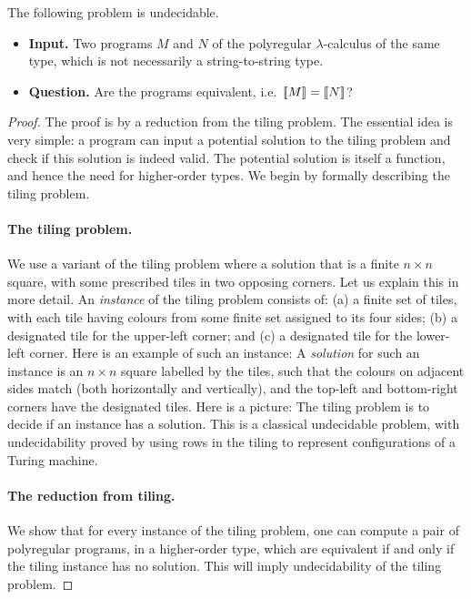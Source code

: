 \documentclass{article}
\begin{document}
\begin{theorem}\label{thm:undecidability}
    The following problem is undecidable. 
    \begin{itemize}
        \item \textbf{Input.} Two programs $M$ and $N$ of the polyregular $\lambda$-calculus of the same type, which is not necessarily a string-to-string type.
        \item \textbf{Question.} Are the programs equivalent, i.e.~$[\![M]\!] = [\![N]\!]$?
    \end{itemize}
\end{theorem}
\begin{proof}
The proof is by a reduction from the tiling problem. The essential idea is very simple: a program can input a potential solution to the tiling problem and check if this solution is indeed valid. The potential solution is itself a function, and hence the need for higher-order types. We begin by formally describing the tiling problem. 

\paragraph*{The tiling problem.} We use a  variant of the tiling problem where  a solution that is a finite $n \times n$ square, with some prescribed tiles in two opposing corners. Let us explain this in more detail. An \emph{instance} of the tiling problem consists of: (a) a finite set  of tiles, with each tile having colours from some finite set  assigned to its four sides;  (b) a designated tile for the upper-left corner; and (c) a designated tile for the lower-left corner. Here is an example of such an instance:
A \emph{solution} for such an instance is an $n \times n$ square labelled by the tiles, such that the colours on adjacent sides match (both horizontally and vertically), and the top-left and bottom-right corners have the designated tiles. Here is a picture:
The tiling problem is to decide if an instance has a solution.  This is a  classical undecidable problem, with undecidability proved by using rows in the tiling to represent configurations of a Turing machine. 

\paragraph*{The reduction from tiling.} We show that for every instance of the tiling problem, one can compute a pair of polyregular programs, in a higher-order type, which are equivalent if and only if the tiling instance has no solution. This will imply undecidability of the tiling problem. 


\end{proof}
\end{document}
